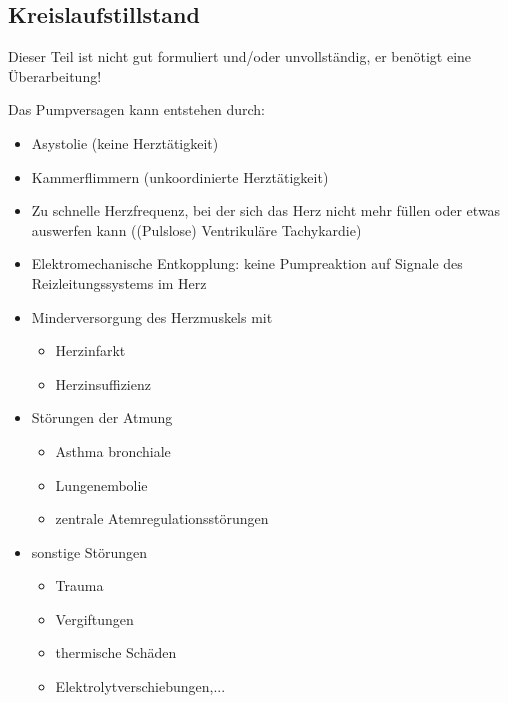\subsection{Kreislaufstillstand}\label{bkm:RefHeading42514602}\label{topic:kreislaufstillstand}


   {Dieser Teil ist nicht gut formuliert und/oder unvollständig, 
   er benötigt eine Überarbeitung!
}

Das Pumpversagen kann entstehen durch:

\begin{itemize}
    \item Asystolie (keine Herztätigkeit)
    \item Kammerflimmern (unkoordinierte Herztätigkeit)
    \item Zu schnelle Herzfrequenz, bei der sich das Herz
    nicht mehr füllen oder etwas auswerfen kann ((Pulslose) Ventrikuläre Tachykardie)
    \item Elektromechanische Entkopplung: keine
    Pumpreaktion auf Signale des Reizleitungssystems im Herz
\end{itemize}

{
\begin{itemize}
  \item Minderversorgung des Herzmuskels mit 
  \begin{itemize}
    \item Herzinfarkt
    \item Herzinsuffizienz
  \end{itemize}
  \item Störungen der Atmung
  \begin{itemize}
    \item Asthma bronchiale
    \item Lungenembolie
    \item zentrale Atemregulationsstörungen
  \end{itemize}
  \item sonstige Störungen
  \begin{itemize}
    \item Trauma
    \item Vergiftungen
    \item thermische Schäden
    \item Elektrolytverschiebungen,...
  \end{itemize}
\end{itemize}
}{}{}{}{}

